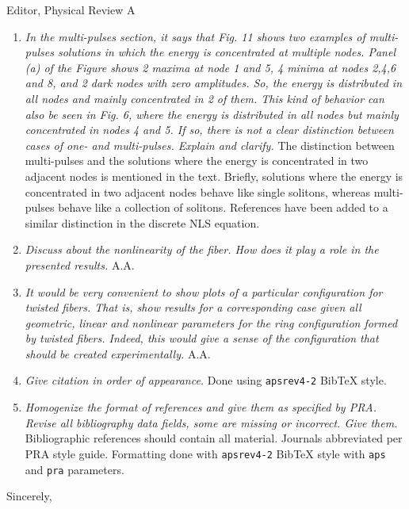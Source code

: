 \documentclass[11pt]{letter}
\begin{document}
\begin{letter}{Editor, Physical Review A}
\begin{enumerate}
\item \emph{In the multi-pulses section, it says that Fig. 11 shows two examples of multi-pulses solutions in which the energy is concentrated at multiple nodes. Panel (a) of the Figure shows 2 maxima at node 1 and 5, 4 minima at nodes 2,4,6 and 8, and 2 dark nodes with zero amplitudes. So, the energy is distributed in all nodes and mainly concentrated in 2 of them. This kind of behavior can also be seen in Fig. 6, where the energy is distributed in all nodes but mainly concentrated in nodes 4 and 5. If so, there is not a clear distinction between cases of one- and multi-pulses. Explain and clarify.} The distinction between multi-pulses and the solutions where the energy is concentrated in two adjacent nodes is mentioned in the text. Briefly, solutions where the energy is concentrated in two adjacent nodes behave like single solitons, whereas multi-pulses behave like a collection of solitons. References have been added to a similar distinction in the discrete NLS equation.

\item \emph{Discuss about the nonlinearity of the fiber. How does it play a role in the presented results.} A.A.

\item \emph{It would be very convenient to show plots of a particular configuration for twisted fibers. That is, show results for a corresponding case given all geometric, linear and nonlinear parameters for the ring configuration formed by twisted fibers. Indeed, this would give a sense of the configuration that should be created experimentally.} A.A.

\item \emph{Give citation in order of appearance.} Done using \texttt{apsrev4-2} BibTeX style.

\item \emph{Homogenize the format of references and give them as specified by PRA. Revise all bibliography data fields, some are missing or incorrect. Give them.} Bibliographic references should contain all material. Journals abbreviated per PRA style guide. Formatting done with \texttt{apsrev4-2} BibTeX style with \texttt{aps} and \texttt{pra} parameters.

\end{enumerate}

\closing{Sincerely,}

\end{letter}
\end{document}
